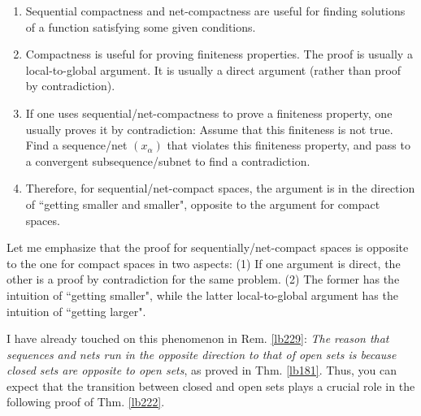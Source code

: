 \documentclass[12pt,b5paper,notitlepage]{article}
\theoremstyle{definition}
\newtheorem{rem}[df]{Remark}
\theoremstyle{plain}
\numberwithin{equation}{section}
\begin{document}
\begin{enumerate}%
\item Sequential compactness and net-compactness are useful for finding solutions of a function satisfying some given conditions. 
\item Compactness is useful for proving finiteness properties. The proof is usually a  local-to-global argument. It is usually a direct argument (rather than proof by contradiction).
\item If one uses sequential/net-compactness to prove a finiteness property, one usually proves it by contradiction: Assume that this finiteness is not true. Find a sequence/net $(x_\alpha)$ that violates this finiteness property, and pass to a convergent subsequence/subnet to find a contradiction.
\item Therefore, for sequential/net-compact spaces, the argument is in the direction of ``getting smaller and smaller", opposite to the argument for compact spaces.
\end{enumerate}

Let me emphasize that the proof for sequentially/net-compact spaces is opposite to the one for compact spaces in two aspects: (1) If one argument is direct, the other is a proof by contradiction for the same problem. (2) The former has the intuition of ``getting smaller", while the latter local-to-global argument has the intuition of ``getting larger". 

I have already touched on this phenomenon in Rem. \ref{lb229}: \textit{The reason that sequences and nets run in the opposite direction to that of open sets is because closed sets are opposite to open sets}, as proved in Thm. \ref{lb181}.  Thus, you can expect that the transition between closed and open sets plays a crucial role in the following proof of Thm. \ref{lb222}. 

\begin{comment}

Now, we have a more vivid sense of the following sentence: 
\begin{itemize}
\item[$\Sun/\Moon$] The seemingly simple fact that ``closed sets are the complements of open sets" is the golden key that allows you to walk between the worlds of dark and light.
\end{itemize}



Let me close this section with a final remark.

\begin{rem}
Logically equivalent concepts are usually not intuitively equivalent. Proving directly is sometimes more transparent and intuitive than proving by contradiction, and sometime vice versa. For example: You will never prove a property by contradiction unless you already know what should be proved, and what statement is expected true. However, a direct argument can be more helpful in finding an unknown property and setting the goal.
\end{rem}
\end{comment}
\end{document}

